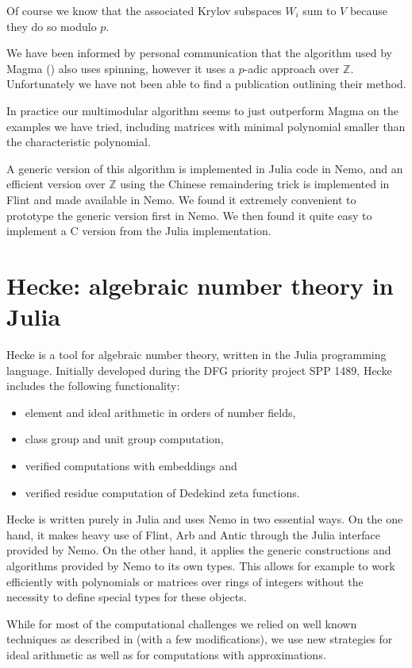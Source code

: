 \documentclass{sig-alternate-05-2015}
\begin{document}
Of course we know that the associated Krylov subspaces $W_i$ sum to $V$
because they do so modulo $p$.

We have been informed by personal communication that the algorithm used by
Magma (\cite{magma}) also uses spinning, however it uses a $p$-adic
approach over $\mathbb{Z}$. Unfortunately we have not been able to find a
publication outlining their method.

In practice our multimodular algorithm seems to just outperform Magma on the
examples we have tried, including matrices with minimal polynomial smaller 
than the characteristic polynomial.

A generic version of this algorithm is implemented in Julia code in Nemo, and
an efficient version over $\mathbb{Z}$ using the Chinese remaindering trick
is implemented in Flint and made available in Nemo.
We found it extremely convenient to prototype the generic version first in
Nemo. We then found it quite easy to implement a C version from the Julia
implementation.

\section{Hecke: algebraic number theory in Julia}

Hecke is a tool for algebraic number theory, written in the Julia programming language.
Initially developed during the DFG priority project SPP 1489, Hecke includes the following functionality:
\begin{itemize}
\item
  element and ideal arithmetic in orders of number fields,
\item
  class group and unit group computation,
\item
  verified computations with embeddings and
\item
  verified residue computation of Dedekind zeta functions.
\end{itemize}

Hecke is written purely in Julia and uses Nemo in two essential ways. On the one hand, it makes heavy use of Flint, Arb and Antic through the Julia interface provided by Nemo.
On the other hand, it applies the generic constructions and algorithms provided by Nemo to its own types. This allows for example to work efficiently with polynomials or matrices over rings of integers without the necessity to define special types for these objects.

While for most of the computational challenges we relied on well known techniques as described in \cite{Cohen1993, Pohst1997, Belabas2004} (with a few modifications), we use new strategies for ideal arithmetic as well as for computations with approximations.
\end{document}

